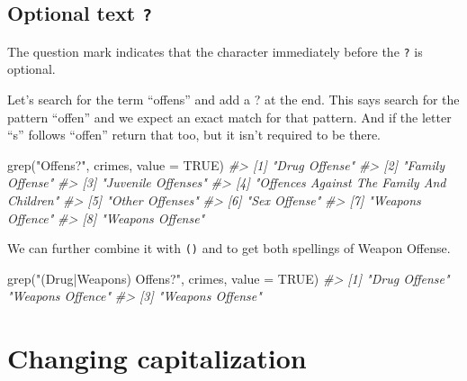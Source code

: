 \documentclass[
]{krantz}
\makeatletter
\newenvironment{Shaded}{\begin{snugshade}}{\end{snugshade}}
\newcommand{\AttributeTok}[1]{\textcolor[rgb]{0.61,0.61,0.61}{#1}}
\newcommand{\CommentTok}[1]{\textcolor[rgb]{0.37,0.37,0.37}{\textit{#1}}}
\newcommand{\ConstantTok}[1]{\textcolor[rgb]{0,0,0}{#1}}
\newcommand{\FunctionTok}[1]{\textcolor[rgb]{0,0,0}{#1}}
\newcommand{\NormalTok}[1]{#1}
\newcommand{\StringTok}[1]{\textcolor[rgb]{0.5,0.5,0.5}{#1}}
\newenvironment{kframe}{%
\medskip{}
\setlength{\fboxsep}{.8em}
 \def\at@end@of@kframe{}%
 \ifinner\ifhmode%
  \def\at@end@of@kframe{\end{minipage}}%
  \begin{minipage}{\columnwidth}%
 \fi\fi%
 \def\FrameCommand##1{\hskip\@totalleftmargin \hskip-\fboxsep
 \colorbox{shadecolor}{##1}\hskip-\fboxsep
     \hskip-\linewidth \hskip-\@totalleftmargin \hskip\columnwidth}%
 \MakeFramed {\advance\hsize-\width
   \@totalleftmargin\z@ \linewidth\hsize
   \@setminipage}}%
 {\par\unskip\endMakeFramed%
 \at@end@of@kframe}
\renewenvironment{Shaded}{\begin{kframe}}{\end{kframe}}
\makeatother
\begin{document}
\hypertarget{optional-text}{%
\subsection{\texorpdfstring{Optional text \texttt{?}}{Optional text ?}}\label{optional-text}}

The question mark indicates that the character immediately before the \texttt{?} is optional.

Let's search for the term ``offens'' and add a ? at the end. This says search for the pattern ``offen'' and we expect an exact match for that pattern. And if the letter ``s'' follows ``offen'' return that too, but it isn't required to be there.

\begin{Shaded}
\begin{Highlighting}[]
\FunctionTok{grep}\NormalTok{(}\StringTok{"Offens?"}\NormalTok{, crimes, }\AttributeTok{value =} \ConstantTok{TRUE}\NormalTok{)}
\CommentTok{\#\textgreater{} [1] "Drug Offense"                            }
\CommentTok{\#\textgreater{} [2] "Family Offense"                          }
\CommentTok{\#\textgreater{} [3] "Juvenile Offenses"                       }
\CommentTok{\#\textgreater{} [4] "Offences Against The Family And Children"}
\CommentTok{\#\textgreater{} [5] "Other Offenses"                          }
\CommentTok{\#\textgreater{} [6] "Sex Offense"                             }
\CommentTok{\#\textgreater{} [7] "Weapons Offence"                         }
\CommentTok{\#\textgreater{} [8] "Weapons Offense"}
\end{Highlighting}
\end{Shaded}

We can further combine it with \texttt{()} and \texttt{\textbar{}} to get both spellings of Weapon Offense.

\begin{Shaded}
\begin{Highlighting}[]
\FunctionTok{grep}\NormalTok{(}\StringTok{"(Drug|Weapons) Offens?"}\NormalTok{, crimes, }\AttributeTok{value =} \ConstantTok{TRUE}\NormalTok{)}
\CommentTok{\#\textgreater{} [1] "Drug Offense"    "Weapons Offence"}
\CommentTok{\#\textgreater{} [3] "Weapons Offense"}
\end{Highlighting}
\end{Shaded}

\hypertarget{changing-capitalization}{%
\section{Changing capitalization}\label{changing-capitalization}}
\end{document}
